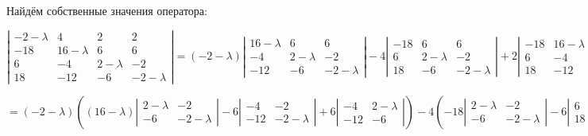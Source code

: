 \documentclass{article}
\begin{document}
\begin{center}
Найдём собственные значения оператора:
\end{center}
$$\left|\begin{matrix}
-2-\lambda & 4 & 2 & 2 \\
-18 & 16-\lambda & 6 & 6 \\
6 & -4 & 2-\lambda & -2 \\
18 & -12 & -6 & -2-\lambda
\end{matrix}\right| = (-2-\lambda)\left|\begin{matrix}
16-\lambda & 6 & 6 \\
-4 & 2-\lambda & -2 \\
-12 & -6 & -2-\lambda
\end{matrix}\right| - 4\left|\begin{matrix}
-18 & 6 & 6 \\
6 & 2-\lambda & -2 \\
18 & -6 & -2-\lambda
\end{matrix}\right| + 2\left|\begin{matrix}
-18 & 16-\lambda & 6 \\
6 & -4 & -2 \\
18 & -12 & -2-\lambda
\end{matrix}\right| - 2\left|\begin{matrix}
-18 & 16-\lambda & 6 \\
6 & -4 & 2-\lambda \\
18 & -12 & -6
\end{matrix}\right| =$$

$$= (-2-\lambda)\left((16-\lambda)\left|\begin{matrix}
2-\lambda & -2 \\
 -6 & -2-\lambda
\end{matrix}\right|-6\left|\begin{matrix}
-4 & -2 \\
-12 & -2-\lambda
\end{matrix}\right|+6\left|\begin{matrix}
-4 & 2-\lambda \\
-12 & -6
\end{matrix}\right|\right) - 4\left(-18\left|\begin{matrix}
2-\lambda & -2 \\
-6 & -2-\lambda
\end{matrix}\right|-6\left|\begin{matrix}
6 & -2 \\
18 & -2-\lambda
\end{matrix}\right|+6\left|\begin{matrix}
6 & 2-\lambda \\
18 & -6
\end{matrix}\right|\right) +$$
\end{document}

